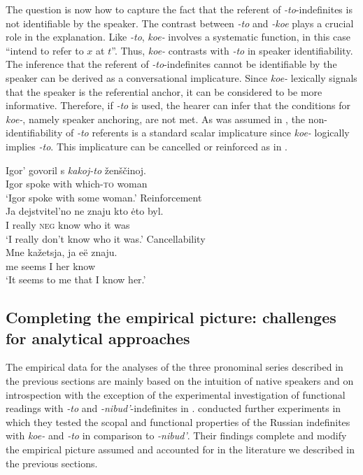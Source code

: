 \documentclass[output=paper,colorlinks,citecolor=brown]{langscibook}
\begin{document}
The question is now how to capture the fact that the referent of \textit{-to}-indefinites is not identifiable by the speaker. The contrast between \textit{-to} and \textit{-koe} plays a crucial role in the explanation. Like \textit{-to}, \textit{koe-} involves a systematic function, in this case “intend to refer to $x$ at $t$”. Thus, \textit{koe-} contrasts with \textit{-to} in speaker identifiability. The inference that the referent of \textit{-to}-indefinites cannot be identifiable by the speaker can be derived as a conversational implicature. Since \textit{koe-} lexically signals that the speaker is the referential anchor, it can be considered to be more informative. Therefore, if \textit{-to} is used, the hearer can infer that the conditions for \textit{koe-}, namely speaker anchoring, are not met. As was assumed in \citet{Geist2008}, the non-identifiability of \textit{-to} referents is a standard scalar implicature since \textit{koe-} logically implies \textit{-to}. This implicature can be cancelled or reinforced as in .

\ea\label{geist:ex:to-cancel}
\gll Igor’ govoril s \textit{kakoj-to} ženščinoj.\\
Igor spoke with which-\textsc{to} woman\\
\glt ‘Igor spoke with some woman.’
\ea Reinforcement\\
\gll Ja dejstvitel’no ne znaju kto ėto byl.\\
I really \textsc{neg} know who it was\\
\glt ‘I really don’t know who it was.’
\ex Cancellability\\
\gll Mne kažetsja, ja eë znaju.\\
me seems I her know\\
\glt ‘It seems to me that I know her.’
\z\z

\subsection{Completing the empirical picture: challenges for analytical approaches}\label{geist:sec:completing}

The empirical data for the analyses of the three pronominal series described in the previous sections are mainly based on the intuition of native speakers and on introspection with the exception of the experimental investigation of functional readings with \textit{-to} and \textit{-nibud’}-indefinites in \citet{Onea.Geist2011}. \citet{Marti.Ionin2019} conducted further experiments in which they tested the scopal and functional properties of the Russian indefinites with \textit{koe-} and \textit{-to} in comparison to \textit{-nibud’}. Their findings complete and modify the empirical picture assumed and accounted for in the literature we described in the previous sections.
\end{document}
